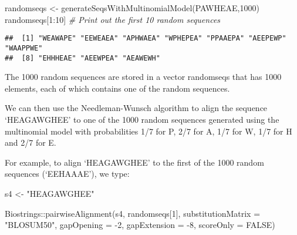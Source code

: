 \documentclass[
]{book}
\newenvironment{Shaded}{\begin{snugshade}}{\end{snugshade}}
\newcommand{\AttributeTok}[1]{\textcolor[rgb]{0.77,0.63,0.00}{#1}}
\newcommand{\CommentTok}[1]{\textcolor[rgb]{0.56,0.35,0.01}{\textit{#1}}}
\newcommand{\ConstantTok}[1]{\textcolor[rgb]{0.00,0.00,0.00}{#1}}
\newcommand{\DecValTok}[1]{\textcolor[rgb]{0.00,0.00,0.81}{#1}}
\newcommand{\FunctionTok}[1]{\textcolor[rgb]{0.00,0.00,0.00}{#1}}
\newcommand{\NormalTok}[1]{#1}
\newcommand{\OtherTok}[1]{\textcolor[rgb]{0.56,0.35,0.01}{#1}}
\newcommand{\SpecialCharTok}[1]{\textcolor[rgb]{0.00,0.00,0.00}{#1}}
\newcommand{\StringTok}[1]{\textcolor[rgb]{0.31,0.60,0.02}{#1}}
\begin{document}
\begin{Shaded}
\begin{Highlighting}[]
\NormalTok{randomseqs }\OtherTok{\textless{}{-}} \FunctionTok{generateSeqsWithMultinomialModel}\NormalTok{(}\StringTok{\textquotesingle{}PAWHEAE\textquotesingle{}}\NormalTok{,}\DecValTok{1000}\NormalTok{)}
\NormalTok{randomseqs[}\DecValTok{1}\SpecialCharTok{:}\DecValTok{10}\NormalTok{] }\CommentTok{\# Print out the first 10 random sequences}
\end{Highlighting}
\end{Shaded}

\begin{verbatim}
##  [1] "WEAWAPE" "EEWEAEA" "APHWAEA" "WPHEPEA" "PPAAEPA" "AEEPEWP" "WAAPPWE"
##  [8] "EHHHEAE" "AEEWPEA" "AEAWEWH"
\end{verbatim}

The 1000 random sequences are stored in a vector randomseqs that has 1000 elements, each of which contains one of the random sequences.

We can then use the Needleman-Wunsch algorithm to align the sequence `HEAGAWGHEE' to one of the 1000 random sequences generated using the multinomial model with probabilities 1/7 for P, 2/7 for A, 1/7 for W, 1/7 for H and 2/7 for E.

For example, to align `HEAGAWGHEE' to the first of the 1000 random sequences (`EEHAAAE'), we type:

\begin{Shaded}
\begin{Highlighting}[]
\NormalTok{s4 }\OtherTok{\textless{}{-}} \StringTok{"HEAGAWGHEE"}
\end{Highlighting}
\end{Shaded}

\begin{Shaded}
\begin{Highlighting}[]
\NormalTok{Biostrings}\SpecialCharTok{::}\FunctionTok{pairwiseAlignment}\NormalTok{(s4, randomseqs[}\DecValTok{1}\NormalTok{], }
                              \AttributeTok{substitutionMatrix =} \StringTok{"BLOSUM50"}\NormalTok{, }
                              \AttributeTok{gapOpening =} \SpecialCharTok{{-}}\DecValTok{2}\NormalTok{,}
                              \AttributeTok{gapExtension =} \SpecialCharTok{{-}}\DecValTok{8}\NormalTok{, }
                              \AttributeTok{scoreOnly =} \ConstantTok{FALSE}\NormalTok{)}
\end{Highlighting}
\end{Shaded}
\end{document}
